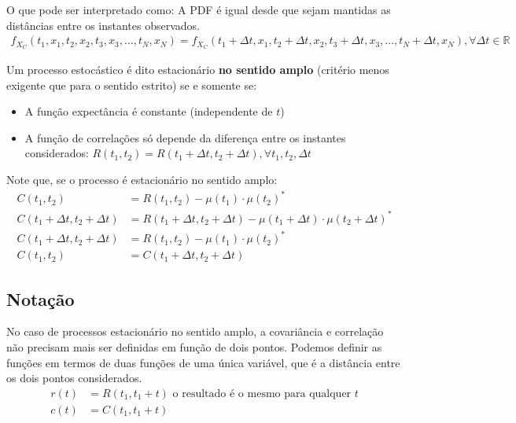 \documentclass{article}
\begin{document}
O que pode ser interpretado como: A PDF é igual desde que sejam mantidas as distâncias entre os
instantes observados.
\begin{align*}
    f_{X_C}(t_1,x_1,t_2,x_2,t_3,x_3,\ldots,t_N,x_N) = f_{X_C}(t_1+\Delta t,x_1,t_2+\Delta
    t,x_2,t_3+\Delta t,x_3,\ldots,t_N+\Delta t,x_N), \forall \Delta t \in \mathbb{R}
\end{align*}

Um processo estocástico é dito estacionário \textbf{no sentido amplo} (critério menos exigente que
para o sentido estrito) se e somente se:

\begin{itemize}
    \item A função expectância é constante (independente de $t$)
    \item A função de correlações só depende da diferença entre os instantes considerados: $R(t_1,
        t_2) = R(t_1 + \Delta t, t_2 + \Delta t), \forall t_1, t_2, \Delta t$
\end{itemize}

Note que, se o processo é estacionário no sentido amplo:
\begin{align*}
    C(t_1, t_2) &= R(t_1,t_2) - \mu(t_1) \cdot \mu(t_2)^* \\
    C(t_1 + \Delta t, t_2 + \Delta t) &= R(t_1 + \Delta t, t_2 + \Delta t) - \mu(t_1+\Delta t) \cdot
    \mu(t_2 + \Delta t)^* \\
    C(t_1 + \Delta t, t_2 + \Delta t) &= R(t_1, t_2) - \mu(t_1) \cdot \mu(t_2)^* \\
    C(t_1, t_2) &= C(t_1 + \Delta t, t_2 + \Delta t)
\end{align*}

\subsection{Notação}
No caso de processos estacionário no sentido amplo, a covariância e correlação não precisam mais ser
definidas em função de dois pontos. Podemos definir as funções em termos de duas funções de uma
única variável, que é a distância entre os dois pontos considerados.
\begin{align*}
    r(t) &= R(t_1, t_1+t) \text{ o resultado é o mesmo para qualquer } t \\
    c(t) &= C(t_1, t_1+t) \\
\end{align*}
\end{document}
